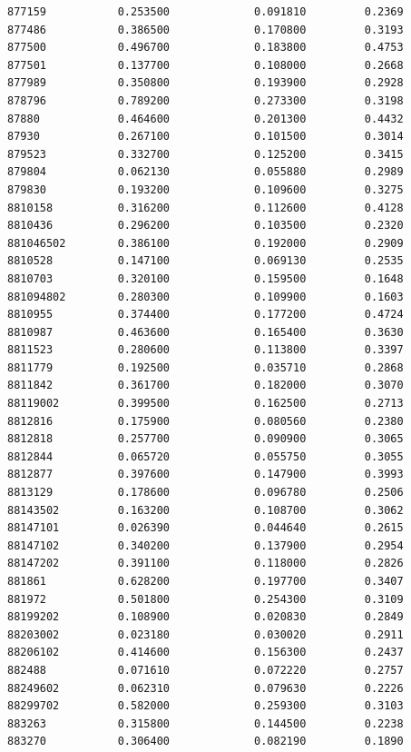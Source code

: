 \documentclass[
  letterpaper,
  DIV=11,
  numbers=noendperiod]{scrartcl}
\begin{document}
\begin{verbatim}
877159           0.253500             0.091810         0.2369
877486           0.386500             0.170800         0.3193
877500           0.496700             0.183800         0.4753
877501           0.137700             0.108000         0.2668
877989           0.350800             0.193900         0.2928
878796           0.789200             0.273300         0.3198
87880            0.464600             0.201300         0.4432
87930            0.267100             0.101500         0.3014
879523           0.332700             0.125200         0.3415
879804           0.062130             0.055880         0.2989
879830           0.193200             0.109600         0.3275
8810158          0.316200             0.112600         0.4128
8810436          0.296200             0.103500         0.2320
881046502        0.386100             0.192000         0.2909
8810528          0.147100             0.069130         0.2535
8810703          0.320100             0.159500         0.1648
881094802        0.280300             0.109900         0.1603
8810955          0.374400             0.177200         0.4724
8810987          0.463600             0.165400         0.3630
8811523          0.280600             0.113800         0.3397
8811779          0.192500             0.035710         0.2868
8811842          0.361700             0.182000         0.3070
88119002         0.399500             0.162500         0.2713
8812816          0.175900             0.080560         0.2380
8812818          0.257700             0.090900         0.3065
8812844          0.065720             0.055750         0.3055
8812877          0.397600             0.147900         0.3993
8813129          0.178600             0.096780         0.2506
88143502         0.163200             0.108700         0.3062
88147101         0.026390             0.044640         0.2615
88147102         0.340200             0.137900         0.2954
88147202         0.391100             0.118000         0.2826
881861           0.628200             0.197700         0.3407
881972           0.501800             0.254300         0.3109
88199202         0.108900             0.020830         0.2849
88203002         0.023180             0.030020         0.2911
88206102         0.414600             0.156300         0.2437
882488           0.071610             0.072220         0.2757
88249602         0.062310             0.079630         0.2226
88299702         0.582000             0.259300         0.3103
883263           0.315800             0.144500         0.2238
883270           0.306400             0.082190         0.1890

\end{verbatim}
\end{document}
